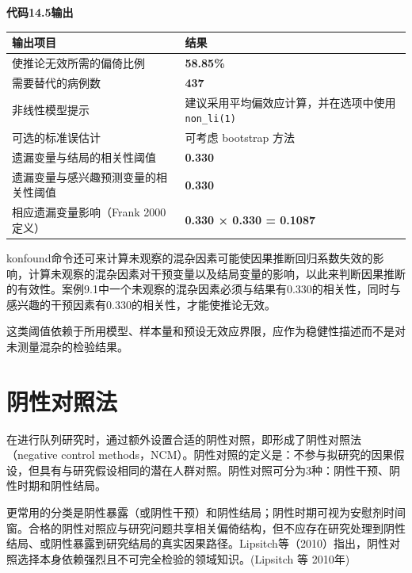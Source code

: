 \documentclass[
  chinese-hans,
  letterpaper,
  DIV=11,
  numbers=noendperiod]{scrreprt}
\newcounter{none} %
\begin{document}
\begin{tcolorbox}[enhanced jigsaw, arc=.35mm, bottomrule=.15mm, breakable, colback=white, colframe=quarto-callout-note-color-frame, left=2mm, leftrule=.75mm, opacityback=0, rightrule=.15mm, toprule=.15mm]

\vspace{-3mm}\textbf{代码14.5输出}\vspace{3mm}

{\def\LTcaptype{none} %
\begin{longtable}[]{@{}ll@{}}
\toprule\noalign{}
输出项目 & 结果 \\
\midrule\noalign{}
\endhead
\bottomrule\noalign{}
\endlastfoot
使推论无效所需的偏倚比例 & \textbf{58.85\%} \\
需要替代的病例数 & \textbf{437} \\
非线性模型提示 & 建议采用平均偏效应计算，并在选项中使用
\texttt{non\_li(1)} \\
可选的标准误估计 & 可考虑 bootstrap 方法 \\
遗漏变量与结局的相关性阈值 & \textbf{0.330} \\
遗漏变量与感兴趣预测变量的相关性阈值 & \textbf{0.330} \\
相应遗漏变量影响（Frank 2000 定义） & \textbf{0.330 × 0.330 = 0.1087} \\
\end{longtable}
}

\end{tcolorbox}

konfound命令还可来计算未观察的混杂因素可能使因果推断回归系数失效的影响，计算未观察的混杂因素对干预变量以及结局变量的影响，以此来判断因果推断的有效性。案例9.1中一个未观察的混杂因素必须与结果有0.330的相关性，同时与感兴趣的干预因素有0.330的相关性，才能使推论无效。

这类阈值依赖于所用模型、样本量和预设无效应界限，应作为稳健性描述而不是对未测量混杂的检验结果。

\section{阴性对照法}\label{ux9634ux6027ux5bf9ux7167ux6cd5}

在进行队列研究时，通过额外设置合适的阴性对照，即形成了阴性对照法（negative
control
methods，NCM）。阴性对照的定义是：不参与拟研究的因果假设，但具有与研究假设相同的潜在人群对照。阴性对照可分为3种：阴性干预、阴性时期和阴性结局。

更常用的分类是阴性暴露（或阴性干预）和阴性结局；阴性时期可视为安慰剂时间窗。合格的阴性对照应与研究问题共享相关偏倚结构，但不应存在研究处理到阴性结局、或阴性暴露到研究结局的真实因果路径。Lipsitch等（2010）指出，阴性对照选择本身依赖强烈且不可完全检验的领域知识。(Lipsitch
等 2010年)
\end{document}
